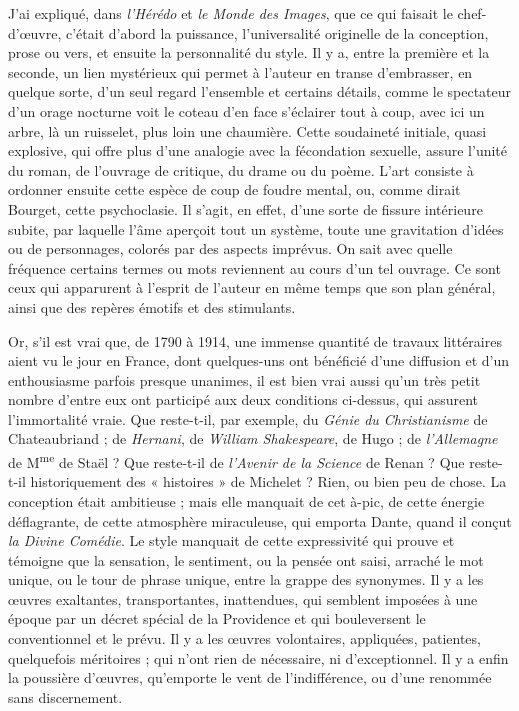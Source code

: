 \documentclass[french,twoside]{book} %
\begin{document}
J’ai expliqué, dans {\itshape l’Hérédo} et {\itshape le Monde des Images}, que ce qui faisait le chef-d’œuvre, c’était d’abord la puissance, l’universalité originelle de la conception, prose ou vers, et ensuite la personnalité du style. Il y a, entre la première et la seconde, un lien mystérieux qui permet à l’auteur en transe d’embrasser, en quelque sorte, d’un seul regard l’ensemble et certains détails, comme le spectateur d’un orage nocturne voit le coteau d’en face s’éclairer tout à coup, avec ici un arbre, là un ruisselet, plus loin une chaumière. Cette soudaineté initiale, quasi explosive, qui offre plus d’une analogie avec la fécondation sexuelle, assure l’unité du roman, de l’ouvrage de critique, du drame ou du poème. L’art consiste à ordonner ensuite cette espèce de coup de foudre mental, ou, comme dirait Bourget, cette psychoclasie. Il s’agit, en effet, d’une sorte de fissure intérieure subite, par laquelle l’âme aperçoit tout un système, toute une gravitation d’idées ou de personnages, colorés par des aspects imprévus. On sait avec quelle fréquence certains termes ou mots reviennent au cours d’un tel ouvrage. Ce sont ceux qui apparurent à l’esprit de l’auteur en même temps que son plan général, ainsi que des repères émotifs et des stimulants.\par
Or, s’il est vrai que, de 1790 à 1914, une immense quantité de travaux littéraires aient vu le jour en France, dont quelques-uns ont bénéficié d’une diffusion et d’un enthousiasme parfois presque unanimes, il est bien vrai aussi qu’un très petit nombre d’entre eux ont participé aux deux conditions ci-dessus, qui assurent l’immortalité vraie. Que reste-t-il, par exemple, du {\itshape Génie du Christianisme} de Chateaubriand ; de {\itshape Hernani}, de {\itshape William Shakespeare}, de Hugo ; de {\itshape l’Allemagne} de M\textsuperscript{me} de Staël ? Que reste-t-il de {\itshape l’Avenir de la Science} de Renan ? Que reste-t-il historiquement des « histoires » de Michelet ? Rien, ou bien peu de chose. La conception était ambitieuse ; mais elle manquait de cet à-pic, de cette énergie déflagrante, de cette atmosphère miraculeuse, qui emporta Dante, quand il conçut {\itshape la Divine Comédie}. Le style manquait de cette expressivité qui prouve et témoigne que la sensation, le sentiment, ou la pensée ont saisi, arraché le mot unique, ou le tour de phrase unique, entre la grappe des synonymes. Il y a les œuvres exaltantes, transportantes, inattendues, qui semblent imposées à une époque par un décret spécial de la Providence et qui bouleversent le conventionnel et le prévu. Il y a les œuvres volontaires, appliquées, patientes, quelquefois méritoires ; qui n’ont rien de nécessaire, ni d’exceptionnel. Il y a enfin la poussière d’œuvres, qu’emporte le vent de l’indifférence, ou d’une renommée sans discernement.\par
\end{document}
